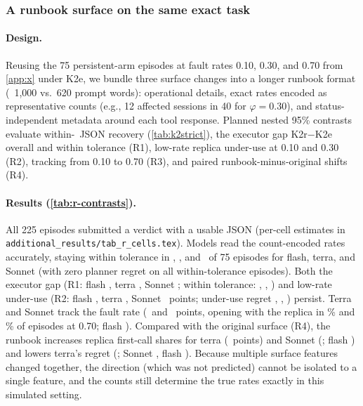 \subsubsection{A runbook surface on the same exact task}\label{app:r}
\paragraph{Design.}
Reusing the 75 persistent-arm episodes at fault rates 0.10, 0.30, and 0.70 from \cref{app:x} under K2e, we bundle three surface changes into a longer runbook format (~1,000 vs.\ 620 prompt words): operational details, exact rates encoded as representative counts (e.g., 12 affected sessions in 40 for $\varphi=0.30$), and status-independent metadata around each tool response. Planned nested 95\% contrasts evaluate within-\agStrTol\ JSON recovery (\cref{tab:k2strict}), the executor gap K2r$-$K2e overall and within tolerance (R1), low-rate replica under-use at 0.10 and 0.30 (R2), tracking from 0.10 to 0.70 (R3), and paired runbook-minus-original shifts (R4).

\paragraph{Results (\cref{tab:r-contrasts}).}
All 225 episodes submitted a verdict with a usable JSON (per-cell estimates in \texttt{additional\_results/tab\_r\_cells.tex}). Models read the count-encoded rates accurately, staying within tolerance in \rbFlashNTol, \rbTerraNTol, and \rbSonnetNTol\ of 75 episodes for flash, terra, and Sonnet (with zero planner regret on all within-tolerance episodes). Both the executor gap (R1: flash \rbFlashGap, terra \rbTerraGap, Sonnet \rbSonnetGap; within tolerance: \rbFlashGapTol, \rbTerraGapTol, \rbSonnetGapTol) and low-rate under-use (R2: flash \rbFlashLowGap, terra \rbTerraLowGap, Sonnet \rbSonnetLowGap\ points; under-use regret \rbFlashLowUnder, \rbTerraLowUnder, \rbSonnetLowUnder) persist. Terra and Sonnet track the fault rate (\rbTerraTrack\ and \rbSonnetTrack\ points, opening with the replica in \rbTerraFirstHigh\% and \rbSonnetFirstHigh\% of episodes at 0.70; flash \rbFlashTrack). Compared with the original surface (R4), the runbook increases replica first-call shares for terra (\rbTerraSurfFirst\ points) and Sonnet (\rbSonnetSurfFirst; flash \rbFlashSurfFirst) and lowers terra's regret (\rbTerraSurfRegret; Sonnet \rbSonnetSurfRegret, flash \rbFlashSurfRegret). Because multiple surface features changed together, the direction (which was not predicted) cannot be isolated to a single feature, and the counts still determine the true rates exactly in this simulated setting.

